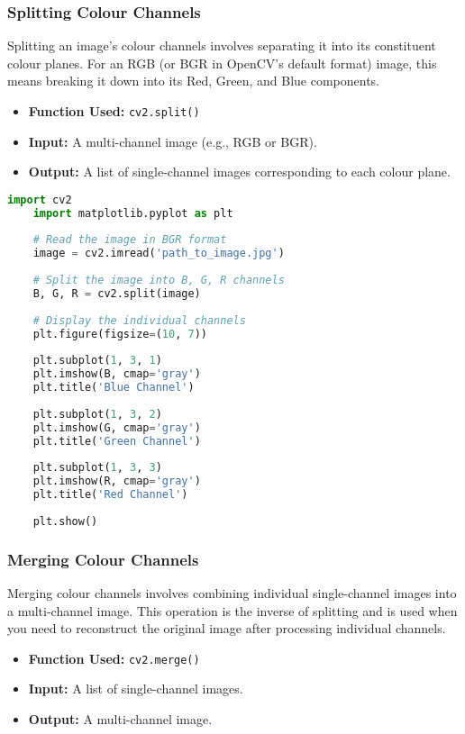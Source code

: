 \subsubsection{Splitting Colour Channels}
Splitting an image's colour channels involves separating it into its constituent colour planes. For an RGB (or BGR in OpenCV's default format) image, this means breaking it down into its Red, Green, and Blue components.\cite{Dawson:2014}

\begin{itemize}
	\item \textbf{Function Used:} \lstinline{cv2.split()}
	\item \textbf{Input:} A multi-channel image (e.g., RGB or BGR).
	\item \textbf{Output:} A list of single-channel images corresponding to each colour plane.
\end{itemize}

\begin{lstlisting}[language=Python, caption=Splitting Colour Channels]
	import cv2
	import matplotlib.pyplot as plt
	
	# Read the image in BGR format
	image = cv2.imread('path_to_image.jpg')
	
	# Split the image into B, G, R channels
	B, G, R = cv2.split(image)
	
	# Display the individual channels
	plt.figure(figsize=(10, 7))
	
	plt.subplot(1, 3, 1)
	plt.imshow(B, cmap='gray')
	plt.title('Blue Channel')
	
	plt.subplot(1, 3, 2)
	plt.imshow(G, cmap='gray')
	plt.title('Green Channel')
	
	plt.subplot(1, 3, 3)
	plt.imshow(R, cmap='gray')
	plt.title('Red Channel')
	
	plt.show()
\end{lstlisting}

\subsubsection{Merging Colour Channels}
Merging colour channels involves combining individual single-channel images into a multi-channel image. This operation is the inverse of splitting and is used when you need to reconstruct the original image after processing individual channels.\cite{Dawson:2014}


\begin{itemize}
	\item \textbf{Function Used:} \lstinline{cv2.merge()}
	\item \textbf{Input:} A list of single-channel images.
	\item \textbf{Output:} A multi-channel image.
\end{itemize}


